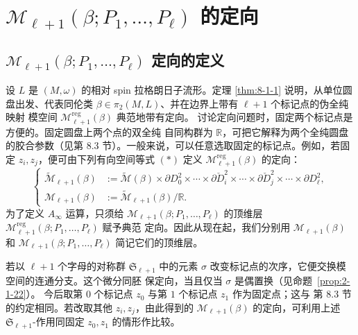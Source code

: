 
\section{$\mathcal M_{\ell+1}(\beta;P_1,\ldots,P_\ell)$ 的定向}
\label{sec:8-4}

\subsection{$\mathcal M_{\ell+1}(\beta;P_1,\ldots,P_\ell)$ 定向的定义}
\label{sec:8-4-1}

设 $L$ 是 $(M,\omega)$ 的相对 spin 拉格朗日子流形。定理
\ref{thm:8-1-1} 说明，从单位圆盘出发、代表同伦类
$\beta\in\pi_2(M,L)$、并在边界上带有 $\ell+1$ 个标记点的伪全纯映射
模空间 $\mathcal M_{\ell+1}^{\mathrm{reg}}(\beta)$ 典范地带有定向。%
讨论定向问题时，固定两个标记点是方便的。固定圆盘上两个点的双全纯
自同构群为 $\mathbb R$，可把它解释为两个全纯圆盘的胶合参数（见第
8.3 节）。一般来说，可以任意选取固定的标记点。例如，若固定
$z_i,z_j$，便可由下列有向空间等式 $(*)$ 定义
$\mathcal M_{\ell+1}^{\mathrm{reg}}(\beta)$ 的定向：
\begin{equation}
 \left\{
 \begin{aligned}
  \widetilde{\mathcal M}_{\ell+1}(\beta)
  &:={}
  \widetilde{\mathcal M}(\beta)
  \times\partial D_0^2\times\cdots\times\partial\check D_i^2
  \times\cdots\times\partial\check D_j^2
  \times\cdots\times\partial D_\ell^2,\\
  \mathcal M_{\ell+1}(\beta)
  &:={}
  \widetilde{\mathcal M}_{\ell+1}(\beta)/\mathbb R.
 \end{aligned}
 \right.
 \tag{*}\label{eq:8-4-star}
\end{equation}
为了定义 $A_\infty$ 运算，只须给
$\mathcal M_{\ell+1}(\beta;P_1,\ldots,P_\ell)$ 的顶维层
$\mathcal M_{\ell+1}^{\mathrm{reg}}(\beta;P_1,\ldots,P_\ell)$ 赋予典范
定向。因此从现在起，我们分别用
$\mathcal M_{\ell+1}(\beta)$ 和
$\mathcal M_{\ell+1}(\beta;P_1,\ldots,P_\ell)$ 简记它们的顶维层。

若以 $\ell+1$ 个字母的对称群 $\mathfrak S_{\ell+1}$ 中的元素
$\sigma$ 改变标记点的次序，它便交换模空间的连通分支。这个微分同胚
保定向，当且仅当 $\sigma$ 是偶置换（见命题~\ref{prop:2-1-22}）。
今后取第 $0$ 个标记点 $z_0$ 与第 $1$ 个标记点 $z_1$ 作为固定点；这与
第 8.3 节的约定相同。若改取其他 $z_i,z_j$，由此得到的
$\mathcal M_{\ell+1}(\beta)$ 的定向，可利用上述
$\mathfrak S_{\ell+1}$-作用同固定 $z_0,z_1$ 的情形作比较。

